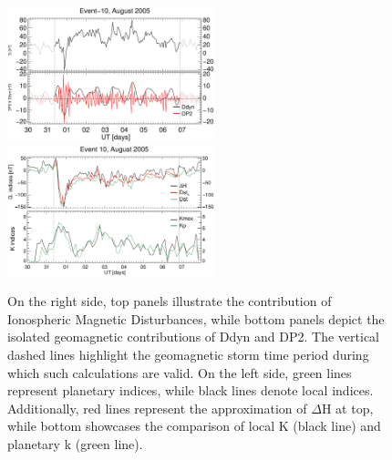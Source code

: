 \documentclass[a4paper,fleqn]{cas-dc}
\begin{document}
\begin{figure}[h!]
       \centerline{\Large \bf   
      \hspace{0.275\textwidth}  \color{black}{}
       \hspace{0.295\textwidth}  \color{black}{}
         \hfill}
	\includegraphics[width=6.0cm]{images/diono/iono_PI_V1_2005-08-30.eps}
	\includegraphics[width=6.0cm]{images/dH_approx/diono_valid_V4_2005-08-30.eps}	
       
       \caption{On the right side, top panels illustrate the contribution of Ionospheric Magnetic Disturbances, while bottom panels depict the isolated geomagnetic contributions of Ddyn and DP2. The vertical dashed lines highlight the geomagnetic storm time period during which such calculations are valid. On the left side, green lines represent planetary indices, while black lines denote local indices. Additionally, red lines represent the approximation of $\Delta$H at top, while bottom showcases the comparison of local K (black line) and planetary k (green line).
       }
    \label{fig:iono_resp3}
\end{figure}
\end{document}
